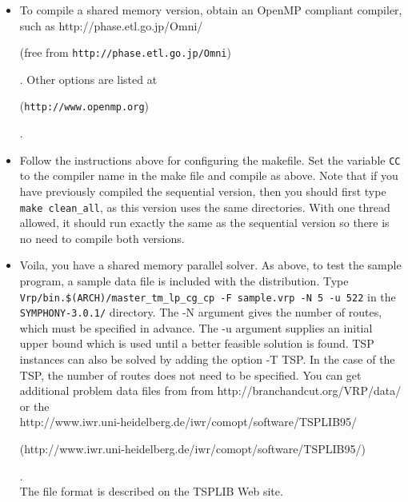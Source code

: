 \begin{itemize}
        \item To compile a shared memory version, obtain an OpenMP
        compliant compiler, such as 
        {http://phase.etl.go.jp/Omni/}
\begin{latexonly} 
        (free from {\tt http://phase.etl.go.jp/Omni})
\end{latexonly}. 
        Other options are listed at 
\begin{latexonly}
        ({\tt http://www.openmp.org})
\end{latexonly}.

        \item Follow the instructions above for configuring the makefile. Set
the variable {\tt CC} to the compiler name in the make file and compile as
above. Note that if you have previously compiled the sequential version, then
you should first type {\tt make clean\_all}, as this version uses the same
directories.  With one thread allowed, it should run exactly the same as the
sequential version so there is no need to compile both versions.

        \item Voila, you have a shared memory parallel solver. As above, to
test the sample program, a sample data file is included with the
distribution. Type {\tt Vrp/bin.\$(ARCH)/master\_tm\_lp\_cg\_cp -F sample.vrp
-N 5 -u 522} in the {\tt SYMPHONY-3.0.1/} directory. The -N argument gives the number
of routes, which must be specified in advance. The -u argument supplies an
initial upper bound which is used until a better feasible solution is
found. TSP instances can also be solved by adding the option -T TSP. In the
case of the TSP, the number of routes does not need to be specified. You can
get additional problem data files from from  {http://branchandcut.org/VRP/data/} or the
\\ 
{http://www.iwr.uni-heidelberg.de/iwr/comopt/software/TSPLIB95/}
\begin{latexonly}
        (http://www.iwr.uni-heidelberg.de/iwr/comopt/software/TSPLIB95/)
\end{latexonly}. \\
The file format is described on the TSPLIB Web site.

\end{itemize}

